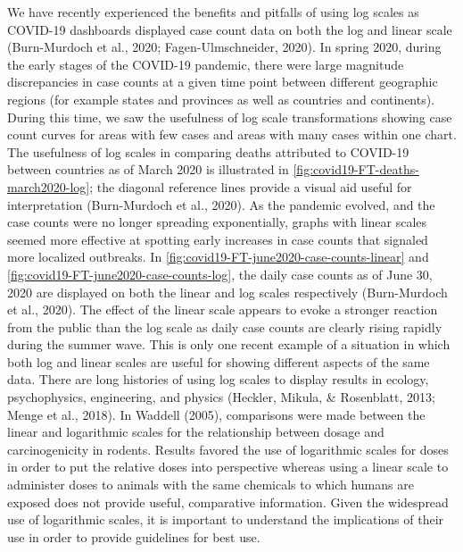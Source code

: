 \documentclass[print]{nuthesis}
\begin{document}
We have recently experienced the benefits and pitfalls of using log scales as COVID-19 dashboards displayed
case count data on both the log and linear scale (Burn-Murdoch et al., 2020; Fagen-Ulmschneider, 2020).
In spring 2020, during the early stages of the COVID-19 pandemic, there were large magnitude discrepancies in case counts at a given time point between different geographic regions (for example states and provinces as well as countries and continents).
During this time, we saw the usefulness of log scale transformations showing case count curves for areas with few cases and areas with many cases within one chart.
The usefulness of log scales in comparing deaths attributed to COVID-19 between countries as of March 2020 is illustrated in \cref{fig:covid19-FT-deaths-march2020-log}; the diagonal reference lines provide a visual aid useful for interpretation (Burn-Murdoch et al., 2020).
As the pandemic evolved, and the case counts were no longer spreading exponentially, graphs with linear scales seemed more effective at spotting early increases in case counts that signaled more localized outbreaks. In \cref{fig:covid19-FT-june2020-case-counts-linear} and \cref{fig:covid19-FT-june2020-case-counts-log}, the daily case counts as of June 30, 2020 are displayed on both the linear and log scales respectively (Burn-Murdoch et al., 2020).
The effect of the linear scale  appears to evoke a stronger reaction from the public than the log scale  as daily case counts are clearly rising rapidly during the summer wave.
This is only one recent example of a situation in which both log and linear scales are useful for showing different aspects of the same data.
There are long histories of using log scales to display results in ecology, psychophysics, engineering, and physics (Heckler, Mikula, \& Rosenblatt, 2013; Menge et al., 2018).
In Waddell (2005), comparisons were made between the linear and logarithmic scales for the relationship between dosage and carcinogenicity in rodents.
Results favored the use of logarithmic scales for doses in order to put the relative doses into perspective whereas using a linear scale to administer doses to animals with the same chemicals to which humans are exposed does not provide useful, comparative information.
Given the widespread use of logarithmic scales, it is important to understand the implications of their use in order to provide guidelines for best use.
\end{document}
